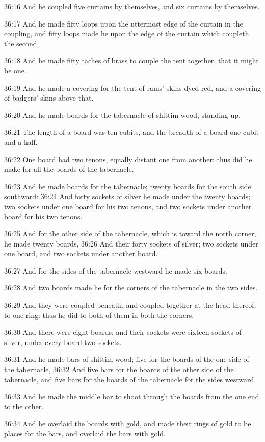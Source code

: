 36:16 And he coupled five curtains by themselves, and six curtains by
themselves.

36:17 And he made fifty loops upon the uttermost edge of the curtain
in the coupling, and fifty loops made he upon the edge of the curtain
which coupleth the second.

36:18 And he made fifty taches of brass to couple the tent together,
that it might be one.

36:19 And he made a covering for the tent of rams' skins dyed red, and
a covering of badgers' skins above that.

36:20 And he made boards for the tabernacle of shittim wood, standing
up.

36:21 The length of a board was ten cubits, and the breadth of a board
one cubit and a half.

36:22 One board had two tenons, equally distant one from another: thus
did he make for all the boards of the tabernacle.

36:23 And he made boards for the tabernacle; twenty boards for the
south side southward: 36:24 And forty sockets of silver he made under
the twenty boards; two sockets under one board for his two tenons, and
two sockets under another board for his two tenons.

36:25 And for the other side of the tabernacle, which is toward the
north corner, he made twenty boards, 36:26 And their forty sockets of
silver; two sockets under one board, and two sockets under another
board.

36:27 And for the sides of the tabernacle westward he made six boards.

36:28 And two boards made he for the corners of the tabernacle in the
two sides.

36:29 And they were coupled beneath, and coupled together at the head
thereof, to one ring: thus he did to both of them in both the corners.

36:30 And there were eight boards; and their sockets were sixteen
sockets of silver, under every board two sockets.

36:31 And he made bars of shittim wood; five for the boards of the one
side of the tabernacle, 36:32 And five bars for the boards of the
other side of the tabernacle, and five bars for the boards of the
tabernacle for the sides westward.

36:33 And he made the middle bar to shoot through the boards from the
one end to the other.

36:34 And he overlaid the boards with gold, and made their rings of
gold to be places for the bars, and overlaid the bars with gold.

